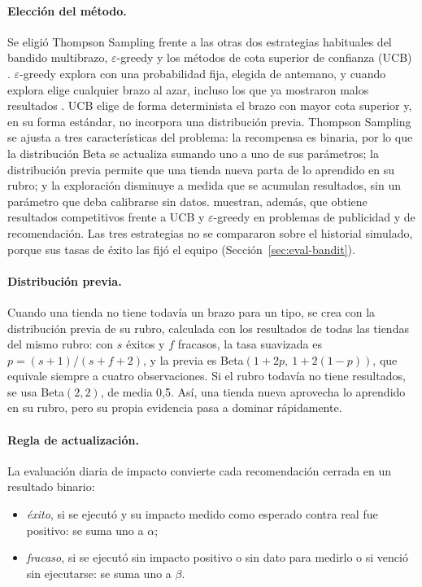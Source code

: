 \paragraph{Elección del método.} Se eligió Thompson Sampling frente a las otras dos estrategias habituales del bandido multibrazo, $\varepsilon$-greedy y los métodos de cota superior de confianza (UCB) \parencite{Sutton2018}. $\varepsilon$-greedy explora con una probabilidad fija, elegida de antemano, y cuando explora elige cualquier brazo al azar, incluso los que ya mostraron malos resultados \parencite{Russo2018}. UCB elige de forma determinista el brazo con mayor cota superior y, en su forma estándar, no incorpora una distribución previa. Thompson Sampling se ajusta a tres características del problema: la recompensa es binaria, por lo que la distribución Beta se actualiza sumando uno a uno de sus parámetros; la distribución previa permite que una tienda nueva parta de lo aprendido en su rubro; y la exploración disminuye a medida que se acumulan resultados, sin un parámetro que deba calibrarse sin datos. \textcite{Chapelle2011} muestran, además, que obtiene resultados competitivos frente a UCB y $\varepsilon$-greedy en problemas de publicidad y de recomendación. Las tres estrategias no se compararon sobre el historial simulado, porque sus tasas de éxito las fijó el equipo (Sección~\ref{sec:eval-bandit}).

\paragraph{Distribución previa.} Cuando una tienda no tiene todavía un brazo para un tipo, se crea con la distribución previa de su rubro, calculada con los resultados de todas las tiendas del mismo rubro: con $s$ éxitos y $f$ fracasos, la tasa suavizada es $p = (s + 1)/(s + f + 2)$, y la previa es Beta$(1 + 2p,\ 1 + 2(1 - p))$, que equivale siempre a cuatro observaciones. Si el rubro todavía no tiene resultados, se usa Beta$(2, 2)$, de media 0,5. Así, una tienda nueva aprovecha lo aprendido en su rubro, pero su propia evidencia pasa a dominar rápidamente.

\paragraph{Regla de actualización.} La evaluación diaria de impacto convierte cada recomendación cerrada en un resultado binario:

\begin{itemize}
    \item \emph{éxito}, si se ejecutó y su impacto medido como esperado contra real fue positivo: se suma uno a $\alpha$;
    \item \emph{fracaso}, si se ejecutó sin impacto positivo o sin dato para medirlo o si venció sin ejecutarse: se suma uno a $\beta$.
\end{itemize}

